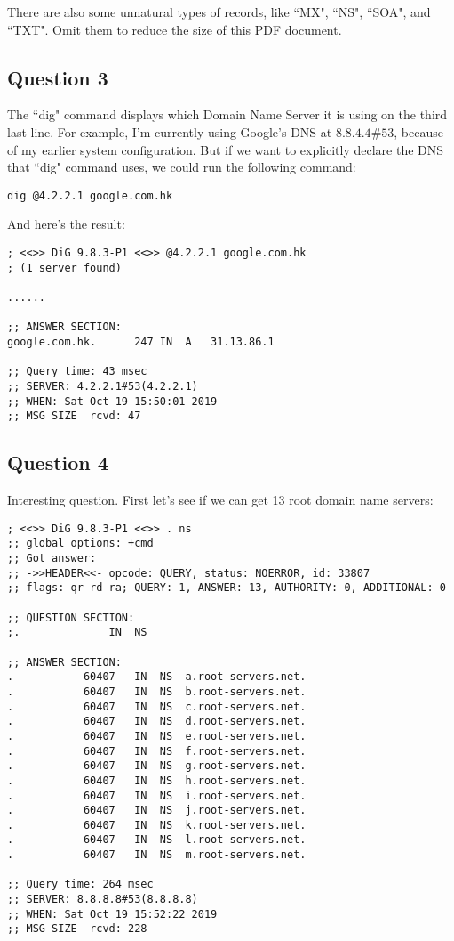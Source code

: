\documentclass{article}
\begin{document}
There are also some unnatural types of records, like ``MX", ``NS", ``SOA", and ``TXT". Omit them to reduce the size of this PDF document.

\subsection*{Question 3}

The ``dig" command displays which Domain Name Server it is using on the third last line. For example, I'm currently using Google's DNS at $8.8.4.4\#53$, because of my earlier system configuration. But if we want to explicitly declare the DNS that ``dig" command uses, we could run the following command:

\begin{lstlisting}[numberstyle=\tiny\monaco,
        basicstyle=\small\monaco]
dig @4.2.2.1 google.com.hk
\end{lstlisting}

And here's the result:

\begin{lstlisting}[numberstyle=\tiny\monaco,
        basicstyle=\small\monaco]
; <<>> DiG 9.8.3-P1 <<>> @4.2.2.1 google.com.hk
; (1 server found)

......

;; ANSWER SECTION:
google.com.hk.		247	IN	A	31.13.86.1

;; Query time: 43 msec
;; SERVER: 4.2.2.1#53(4.2.2.1)
;; WHEN: Sat Oct 19 15:50:01 2019
;; MSG SIZE  rcvd: 47
\end{lstlisting}

\subsection*{Question 4}

Interesting question. First let's see if we can get 13 root domain name servers:

\begin{lstlisting}[numberstyle=\tiny\monaco,
        basicstyle=\small\monaco]
; <<>> DiG 9.8.3-P1 <<>> . ns
;; global options: +cmd
;; Got answer:
;; ->>HEADER<<- opcode: QUERY, status: NOERROR, id: 33807
;; flags: qr rd ra; QUERY: 1, ANSWER: 13, AUTHORITY: 0, ADDITIONAL: 0

;; QUESTION SECTION:
;.				IN	NS

;; ANSWER SECTION:
.			60407	IN	NS	a.root-servers.net.
.			60407	IN	NS	b.root-servers.net.
.			60407	IN	NS	c.root-servers.net.
.			60407	IN	NS	d.root-servers.net.
.			60407	IN	NS	e.root-servers.net.
.			60407	IN	NS	f.root-servers.net.
.			60407	IN	NS	g.root-servers.net.
.			60407	IN	NS	h.root-servers.net.
.			60407	IN	NS	i.root-servers.net.
.			60407	IN	NS	j.root-servers.net.
.			60407	IN	NS	k.root-servers.net.
.			60407	IN	NS	l.root-servers.net.
.			60407	IN	NS	m.root-servers.net.

;; Query time: 264 msec
;; SERVER: 8.8.8.8#53(8.8.8.8)
;; WHEN: Sat Oct 19 15:52:22 2019
;; MSG SIZE  rcvd: 228
\end{lstlisting}
\end{document}
